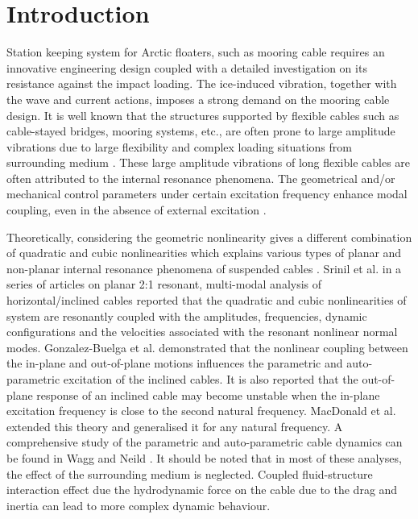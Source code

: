\documentclass[review]{elsarticle}
\begin{document}
\section{Introduction}
Station keeping system for Arctic floaters, such as mooring cable requires an innovative engineering design coupled with a detailed investigation on its resistance against the impact loading. The ice-induced vibration, together with the wave and current actions, imposes a strong demand on the mooring cable design. It is well known that the structures supported by flexible cables such as cable-stayed bridges, mooring systems, etc., are often prone to large amplitude vibrations due to large flexibility and complex loading situations from surrounding medium \cite{Nayfeh_2004}. These large amplitude vibrations of long flexible cables are often attributed to the internal resonance phenomena. The geometrical and/or mechanical control parameters under certain excitation frequency enhance modal coupling, even in the absence of external excitation \cite{Rega_2004}.

Theoretically, considering the geometric nonlinearity gives a different combination of quadratic and cubic nonlinearities which explains various types of planar and non-planar internal resonance phenomena of suspended cables \cite{Gonzalez_2008}. Srinil et al. \cite{Srinil_2007a,Srinil_2007b} in a series of articles on planar 2:1 resonant, multi-modal analysis of horizontal/inclined cables reported that the quadratic and cubic nonlinearities of system  are resonantly coupled with the amplitudes, frequencies, dynamic configurations and the velocities associated with the resonant nonlinear normal modes. Gonzalez-Buelga et al. \cite{Gonzalez_2008} demonstrated that the nonlinear coupling between the in-plane and out-of-plane motions influences the parametric and auto-parametric excitation of the inclined cables. It is also reported that the out-of-plane response of an inclined cable may become unstable when the in-plane excitation frequency is close to the second natural frequency. MacDonald et al. \cite{Macdonald_2010} extended this theory and generalised it for any natural frequency. A comprehensive study of the parametric and auto-parametric cable dynamics can be found in Wagg and Neild \cite{Wagg_2009}. It should be noted that in most of these analyses, the effect of the surrounding medium is neglected. Coupled fluid-structure interaction effect due the hydrodynamic force \cite{Chakrabarti_1987} on the cable due to the drag and inertia can lead to more complex dynamic behaviour. 
\end{document}
